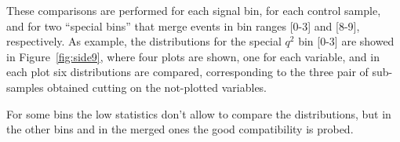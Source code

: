 These comparisons are performed for each signal bin, for each control sample, and for two ``special bins'' that merge events in bin ranges [0-3] and [8-9], respectively.
As example, the distributions for the special $q^2$ bin [0-3] are showed in Figure~\ref{fig:side9}, where four plots are shown, one for each variable, and in each plot six distributions are compared, corresponding to the three pair of sub-samples obtained cutting on the not-plotted variables.

For some bins the low statistics don't allow to compare the distributions, but in the other bins and in the merged ones the good compatibility is probed.



